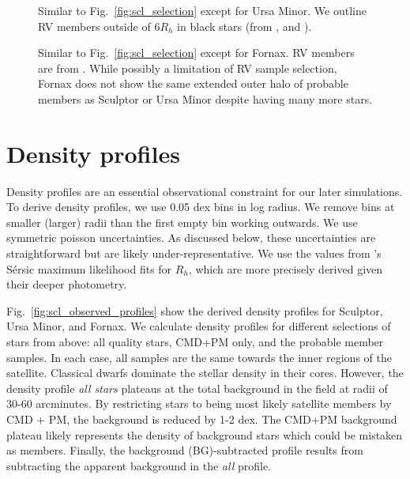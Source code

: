 \begin{figure}
\centering
{}
\caption[Ursa Minor sample selection]{Similar to
Fig.~\ref{fig:scl_selection} except for Ursa Minor. We outline RV
members outside of \(6R_h\) in black stars (from \citet{sestito+2023b},
\citet{pace+2020} and \citet{spencer+2018}).}\label{fig:umi_selection}
\end{figure}

\begin{figure}
\centering
{}
\caption[Fornax sample selection]{Similar to
Fig.~\ref{fig:scl_selection} except for Fornax. RV members are from
\citet{WMO2009}. While possibly a limitation of RV sample selection,
Fornax does not show the same extended outer halo of probable members as
Sculptor or Ursa Minor despite having many more
stars.}\label{fig:fornax_selection}
\end{figure}

\section{Density profiles}\label{density-profiles}

Density profiles are an essential observational constraint for our later
simulations. To derive density profiles, we use 0.05 dex bins in log
radius. We remove bins at smaller (larger) radii than the first empty
bin working outwards. We use symmetric poisson uncertainties. As
discussed below, these uncertainties are straightforward but are likely
under-representative. We use the values from \citet{munoz+2018}'s Sérsic
maximum likelihood fits for \(R_h\), which are more precisely derived
given their deeper photometry.

Fig.~\ref{fig:scl_observed_profiles} show the derived density profiles
for Sculptor, Ursa Minor, and Fornax. We calculate density profiles for
different selections of stars from above: all quality stars, CMD+PM
only, and the probable member samples. In each case, all samples are the
same towards the inner regions of the satellite. Classical dwarfs
dominate the stellar density in their cores. However, the density
profile \emph{all stars} plateaus at the total background in the field
at radii of 30-60 arcminutes. By restricting stars to being most likely
satellite members by CMD + PM, the background is reduced by 1-2 dex. The
CMD+PM background plateau likely represents the density of background
stars which could be mistaken as members. Finally, the background
(BG)-subtracted profile results from subtracting the apparent background
in the \emph{all} profile.

